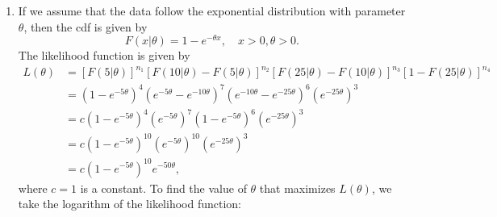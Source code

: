 \begin{solution}
    \begin{enumerate}
        \item If we assume that the data follow the exponential distribution with parameter $\theta$, then the cdf is given by
        \[
            F(x|\theta) = 1 - e^{-\theta x}, \quad x > 0, \theta > 0.
        \]
        The likelihood function is given by
        \begin{align*}
            L(\theta) &= [F(5|\theta)]^{n_1} [F(10|\theta) - F(5|\theta)]^{n_2} [F(25|\theta) - F(10|\theta)]^{n_3} [1 - F(25|\theta)]^{n_4}\\
            &= (1 - e^{-5\theta})^4 (e^{-5\theta} - e^{-10\theta})^7 (e^{-10\theta} - e^{-25\theta})^6 (e^{-25\theta})^3\\
            &= c (1 - e^{-5\theta})^4 (e^{-5\theta})^7 (1 - e^{-5\theta})^6 (e^{-25\theta})^3\\
            &= c (1 - e^{-5\theta})^{10} (e^{-5\theta})^{10} (e^{-25\theta})^3\\
            &= c (1 - e^{-5\theta})^{10} e^{-50\theta},
        \end{align*}
        where $c = 1$ is a constant. To find the value of $\theta$ that maximizes $L(\theta)$, we take the logarithm of the likelihood function:
    \end{enumerate}
\end{solution}